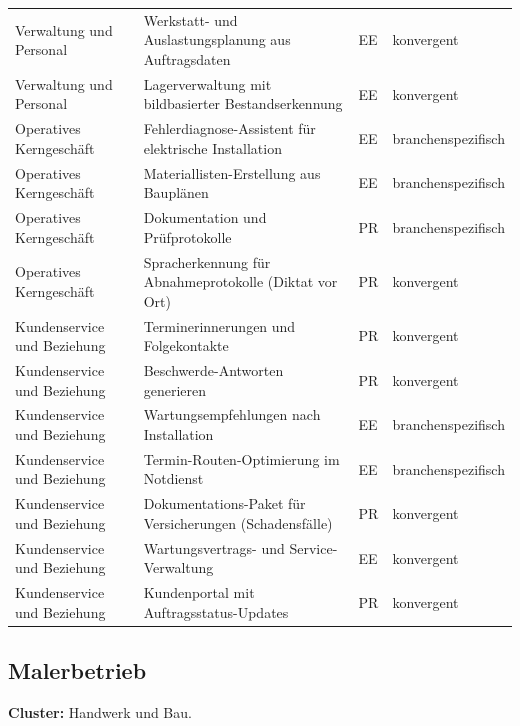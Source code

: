 \documentclass[a4paper,11pt]{article}
\begin{document}
\begin{table}[H]
\begin{tabular}{p{3.3cm}p{7.3cm}p{1cm}p{2.5cm}}
Verwaltung und Personal & Werkstatt- und Auslastungsplanung aus Auftragsdaten & EE & konvergent \\
Verwaltung und Personal & Lagerverwaltung mit bildbasierter Bestandserkennung & EE & konvergent \\
Operatives Kerngeschäft & Fehlerdiagnose-Assistent für elektrische Installation & EE & branchenspezifisch \\
Operatives Kerngeschäft & Materiallisten-Erstellung aus Bauplänen & EE & branchenspezifisch \\
Operatives Kerngeschäft & Dokumentation und Prüfprotokolle & PR & branchenspezifisch \\
Operatives Kerngeschäft & Spracherkennung für Abnahmeprotokolle (Diktat vor Ort) & PR & konvergent \\
Kundenservice und Beziehung & Terminerinnerungen und Folgekontakte & PR & konvergent \\
Kundenservice und Beziehung & Beschwerde-Antworten generieren & PR & konvergent \\
Kundenservice und Beziehung & Wartungsempfehlungen nach Installation & EE & branchenspezifisch \\
Kundenservice und Beziehung & Termin-Routen-Optimierung im Notdienst & EE & branchenspezifisch \\
Kundenservice und Beziehung & Dokumentations-Paket für Versicherungen (Schadensfälle) & PR & konvergent \\
Kundenservice und Beziehung & Wartungsvertrags- und Service-Verwaltung & EE & konvergent \\
Kundenservice und Beziehung & Kundenportal mit Auftragsstatus-Updates & PR & konvergent \\
\bottomrule
\end{tabular}
\end{table}

\subsection*{Malerbetrieb}

\textbf{Cluster:} Handwerk und Bau.
\end{document}

